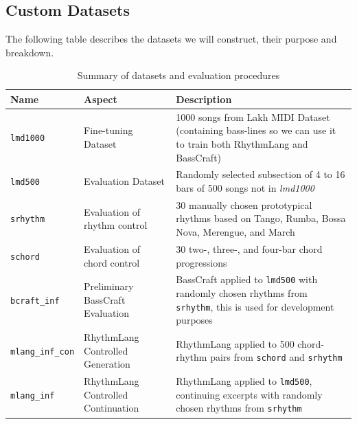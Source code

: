\subsection{Custom Datasets}
The following table describes the datasets we will construct, their purpose and breakdown. 
\begin{table}[h]
    \centering
    \renewcommand{\arraystretch}{1.3}
    \begin{tabular}{|l|p{4cm}|p{7cm}|}
        \hline
        \textbf{Name} & \textbf{Aspect} & \textbf{Description} \\
        \hline
        \texttt{lmd1000} & Fine-tuning Dataset & 1000 songs from Lakh MIDI Dataset \cite{Raffel_2016} (containing bass-lines so we can use it to train both RhythmLang and BassCraft) \\
        \hline
        \texttt{lmd500} & Evaluation Dataset & Randomly selected subsection of 4 to 16 bars of 500 songs not in \textit{lmd1000} \\
        \hline
        \texttt{srhythm} & Evaluation of rhythm control & 30 manually chosen prototypical rhythms based on \cite{Chew_Volk_Lee_Dance_metric_weight_2005} Tango, Rumba, Bossa Nova, Merengue, and March \\
        \hline
        \texttt{schord} & Evaluation of chord control & 30 two-, three-, and four-bar chord progressions \\
        \hline
        \texttt{bcraft\_inf} & Preliminary BassCraft Evaluation & BassCraft applied to \texttt{lmd500} with randomly chosen rhythms from \texttt{srhythm}, this is used for development purposes \\
        \hline
        \texttt{mlang\_inf\_con} & RhythmLang Controlled Generation & RhythmLang applied to 500 chord-rhythm pairs from \texttt{schord} and \texttt{srhythm} \\
        \hline
        \texttt{mlang\_inf} & RhythmLang Controlled Continuation & RhythmLang applied to \texttt{lmd500}, continuing excerpts with randomly chosen rhythms from \texttt{srhythm} \\
        \hline
    \end{tabular}
    \caption{Summary of datasets and evaluation procedures}
    \label{tab:dataset_summary}
\end{table}


